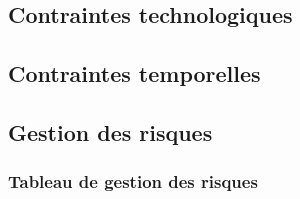 \subsection{Contraintes technologiques}
\subsection{Contraintes temporelles}
\subsection{Gestion des risques}
\subsubsection{Tableau de gestion des risques}